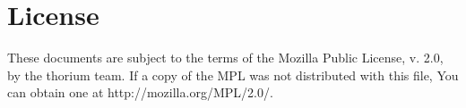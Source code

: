 \section*{License}
These documents are subject to the terms of the Mozilla Public
License, v. 2.0, by the thorium team. If a copy of the MPL was not distributed with this
file, You can obtain one at http://mozilla.org/MPL/2.0/.

